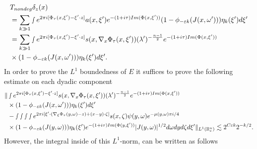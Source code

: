 \documentclass[12pt, reqno]{amsart}
\theoremstyle{definition}
\theoremstyle{remark}
\numberwithin{equation}{section}
\begin{document}
\begin{align*}
     & T_{\textnormal{nondeg}} \delta_z(x)\\
     &= \sum_{k\gg 1}\smallint e^{2\pi i[\Phi_\tau(x,\xi') -\xi'\cdot z]}a(x,\xi')e^{-(1+i\tau)\textnormal{Im}(\Phi(x,\xi'))}(1-\phi_{-\varepsilon k}(J(x,\omega')))\eta_{k}(\xi')d\xi'\\
     &= \sum_{k\gg 1} \smallint e^{2\pi i[\Phi_\tau(x,\xi') -\xi'\cdot z]}s(x,\nabla_x\Phi_\tau(x,\xi'))(\lambda')^{-\frac{n-1}{2}}e^{-(1+i\tau)\textnormal{Im}(\Phi(x,\xi'))}\\
     &\times (1-\phi_{-\varepsilon k}(J(x,\omega')))\eta_{k}(\xi')d\xi'.
\end{align*}In order to prove the $L^1$ boundedness of $E$  it suffices to prove the following estimate on each dyadic component
\begin{align*}
   \Vert &\smallint e^{2\pi i[\Phi_\tau(x,\xi') -\xi'\cdot z]}s(x,\nabla_x\Phi_\tau(x,\xi'))(\lambda')^{-\frac{n-1}{2}}e^{-(1+i\tau)\textnormal{Im}(\Phi(x,\xi'))}\\
    &\times (1-\phi_{-\varepsilon k}(J(x,\omega')))\eta_{k}(\xi')d\xi'\\
    &- \smallint\smallint\smallint\smallint e^{2\pi i[\xi'\cdot( \nabla_\xi\Phi_\tau(y,\omega)-z)+ (x-y)\cdot \zeta]}s(x,\zeta)\psi(y,\omega)e^{-\mu(y,\omega)\pi i/4} \\
&\times (1-\phi_{-\varepsilon k}(J(y,\omega)))\eta_{k}(\xi')e^{-(1+i\tau)\textnormal{Im}(\Phi(y,\xi'))} |J(y,\omega)|^{1/2}d\omega dy d\zeta d\xi'\Vert_{L^1(\mathbb{R}^n_x)}\lesssim 2^{C\varepsilon k}2^{-k/2}.
\end{align*}However, the integral inside of this $L^1$-norm, can be written as follows
\end{document}
